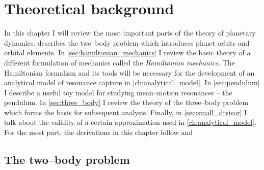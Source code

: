 \documentclass[ twoside,openright,titlepage,numbers=noenddot,headinclude,%
                footinclude=true,cleardoublepage=empty,abstractoff, %
                BCOR=5mm,paper=a4,fontsize=11pt,%
                american,%
                ]{scrreprt}
\begin{document}
\chapter{Theoretical background}
\label{ch:theoretical_background}
In this chapter I will review the most important parts of the theory
of planetary dynamics.  describes the two--body problem which 
introduces planet orbits and orbital elements. In \cref{sec:hamiltonian_mechanics}
I review the basic theory of a different formulation of mechanics called the
\emph{Hamiltonian mechanics}. The Hamiltonian formalism and its tools will
be necessary for the development of an analytical model of resonance
capture in \cref{ch:analytical_model}. In \cref{sec:pendulum}
I describe a useful toy model for studying mean--motion resonances -- the pendulum.
In \cref{sec:three_body} I review the theory of the three--body problem 
which forms the basis for subsequent analysis. Finally, in 
\cref{sec:small_divisor} I talk about the validity of a certain approximation
used in \cref{ch:analytical_model}.
For the most part, the derivations in this chapter follow \cite{murray} and 
\cite{Mardling2013}
\section{The two--body problem}
\label{sec:two_body}
\end{document}
